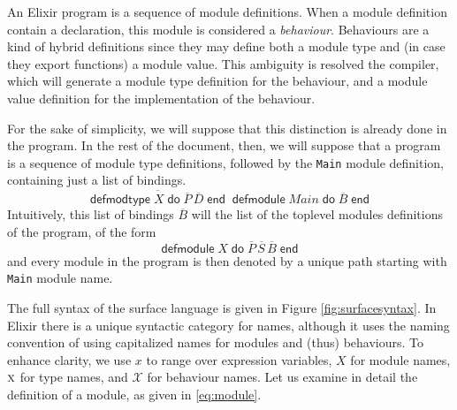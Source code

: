\documentclass[a4paper,10pt]{article}
\author{Aghilas Y. Boussaa}
\DeclareMathOperator{\kwdefmt}{\textsf{defmodtype}}
\DeclareMathOperator{\kwend}{\textsf{end}}
\DeclareMathOperator{\kwdo}{\textsf{do}}
\DeclareMathOperator{\kwdefm}{\textsf{defmodule}}
\newcommand{\tx}{\textsc{x}}
\begin{document}
An Elixir program is a sequence of module definitions. When a module definition contain a  declaration, this module is considered a \emph{behaviour}. Behaviours are a kind of hybrid definitions since they may define both a module type and (in case they export functions) a module value. This ambiguity is resolved the compiler, which will generate a module type definition for the behaviour, and a module value definition for the implementation of the behaviour.

For the sake of simplicity, we will suppose that this distinction is already done in the program. In the rest of the document, then, we will suppose that a program is a sequence of module type definitions, followed by the \texttt{Main} module definition, containing just a list of bindings. 
\[\overline{\kwdefmt X \kwdo \overline{P}\, \overline{D} \kwend}\kwdefm \textit{Main} \kwdo \overline{B} \kwend\]
Intuitively, this list of bindings $\overline{B}$ will the list of the toplevel modules definitions of the program, of the form 
\begin{equation}\label{eq:module}
\kwdefm X \kwdo \overline{P}\, \overline{S}\, \overline{B} \kwend
\end{equation}
and every module in the program is then denoted by a unique path starting with \texttt{Main} module name.

The full syntax of the surface language is given in Figure \ref{fig:surfacesyntax}. In Elixir there is a unique syntactic category for names, although it uses the naming convention of using capitalized names for modules and (thus) behaviours. To enhance clarity, we use $x$ to range over expression variables, $X$ for module names, $\tx$ for type names, and $\mathcal X$ for behaviour names. Let us examine in detail the definition of a module, as given in \eqref{eq:module}.
\end{document}

